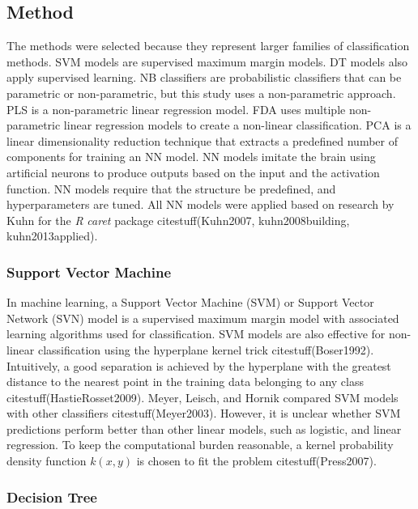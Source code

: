 \let\LaTeXcline\cline\documentclass[sn-mathphys-num]{sn-jnl}\let\cline\LaTeXcline
\begin{document}
\subsection{Method}

The methods were selected because they represent larger families of classification methods. SVM models are supervised maximum margin models. DT models also apply supervised learning. NB classifiers are probabilistic classifiers that can be parametric or non-parametric, but this study uses a non-parametric approach. PLS is a non-parametric linear regression model. FDA uses multiple non-parametric linear regression models to create a non-linear classification. PCA is a linear dimensionality reduction technique that extracts a predefined number of components for training an NN model. NN models imitate the brain using artificial neurons to produce outputs based on the input and the activation function. NN models require that the structure be predefined, and hyperparameters are tuned. All NN models were applied based on research by Kuhn for the \textit{R} \textit{caret} package citestuff(Kuhn2007, kuhn2008building, kuhn2013applied).

\subsubsection{Support Vector Machine}

In machine learning, a Support Vector Machine (SVM) or Support Vector Network (SVN) model is a supervised maximum margin model with associated learning algorithms used for classification. SVM models are also effective for non-linear classification using the hyperplane kernel trick citestuff(Boser1992). Intuitively, a good separation is achieved by the hyperplane with the greatest distance to the nearest point in the training data belonging to any class citestuff(HastieRosset2009). Meyer, Leisch, and Hornik compared SVM models with other classifiers citestuff(Meyer2003). However, it is unclear whether SVM predictions perform better than other linear models, such as logistic, and linear regression. To keep the computational burden reasonable, a kernel probability density function $k(x, y)$ is chosen to fit the problem citestuff(Press2007).

\subsubsection{Decision Tree}
\end{document}
